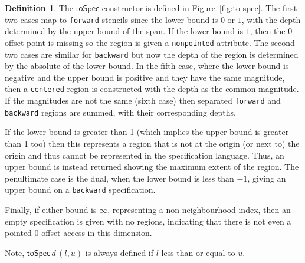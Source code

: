 \documentclass[10pt,preprint]{sigplanconf}
\newcounter{block}
\theoremstyle{definition}
\newtheorem{definition}[block]{Definition}
\begin{document}
\begin{definition} The $\mathsf{toSpec}$ constructor is defined
in Figure~\ref{fig:to-spec}.
The first two cases map to \texttt{forward} stencils since the lower
bound is $0$ or $1$, with the depth determined by the upper bound of
the span. If the lower bound is $1$, then the
$0$-offset point is missing so the region is given a
\texttt{nonpointed} attribute. The second two cases are similar for
\texttt{backward} but now the depth of the region is determined by the
absolute of the lower bound. In the fifth-case, where the lower bound
is negative and the upper bound is positive and they have the same
magnitude, then a \texttt{centered} region is constructed with
the depth as the common magnitude. If the magnitudes are not the same
(sixth case) then separated \texttt{forward} and \texttt{backward}
regions are summed, with their corresponding depths.

If the lower bound is greater than 1
(which implies the upper bound is greater than 1 too) then
this represents a region that is not at the origin (or next to) the
origin and thus cannot be represented in the specification language.
Thus, an upper bound is instead returned showing the maximum extent
of the region. The penultimate case is the dual, when the lower bound is less
than $-1$, giving an upper bound on a \texttt{backward} specification.

Finally, if either bound is $\infty$, representing a non
neighbourhood index, then an empty specification is given
 with no regions, indicating that there is not even a
pointed 0-offset access in this dimension.

Note, $\mathsf{toSpec} \, d \, (l, u)$ is always defined
 if $l$ less than or equal to $u$.
\end{definition}
\end{document}

